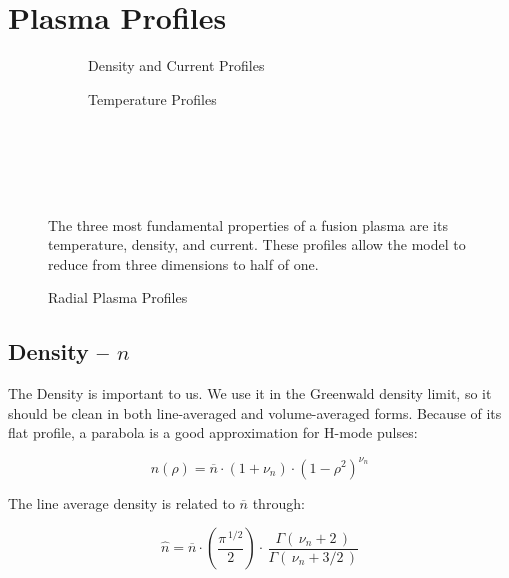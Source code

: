 \chapter{Plasma Profiles}

\label{chapter:profiles}

\begin{figure*}[h]
    \centering
    \hfill 
    \begin{subfigure}[t]{0.45\textwidth}
        \centering
		\begin{adjustbox}{width=\textwidth}
			\Large
			
		\end{adjustbox}
        \caption{Density and Current Profiles}
    \end{subfigure}
    \hfill
    \begin{subfigure}[t]{0.45\textwidth}
        \centering
		\begin{adjustbox}{width=\textwidth}
			\Large
			
		\end{adjustbox}
        \caption{Temperature Profiles}
    \end{subfigure}
    \hfill \hfill ~\\ ~\\ ~\\
    \caption{Radial Plasma Profiles} ~\\
    \small The three most fundamental properties of a fusion plasma are its temperature, density, and current. These profiles allow the model to reduce from three dimensions to half of one.
\end{figure*}

\section{Density -- $n$}

The Density is important to us. We use it in the Greenwald density limit, so it should be clean in both line-averaged and volume-averaged forms. Because of its flat profile, a parabola is a good approximation for H-mode pulses:

\begin{equation}
	n(\rho) = \overline{n} \cdot \left(1 + \nu_n \right) \cdot \left( 1 - \rho^2  \right)^{\nu_n}
\end{equation}

The line average density is related to $\overline{n}$ through:

\begin{equation}
	\hat{n} =  \overline{n} \cdot \left( \frac{\pi ^ { \, 1/2} }{2} \right)  \cdot \, \frac{ \Gamma( \, \nu_n + 2 \, ) }{ \Gamma( \, \nu_n + 3/2 \, ) }
\end{equation}

